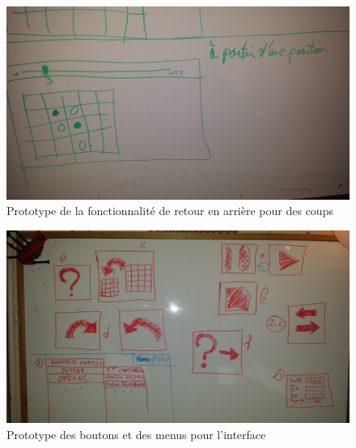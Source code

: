 \documentclass[a4paper,12pt]{article}
\begin{document}
\begin{figure}[H]
\includegraphics[scale=0.1]{position.jpg}
\caption{Prototype de la fonctionnalité de retour en arrière pour des coups}
\label{retour}
\end{figure}

\begin{figure}[H]
\includegraphics[scale=0.1]{boutons.jpg}
\caption{Prototype des boutons et des menus pour l'interface}
\label{boutons}
\end{figure}
\end{document}
